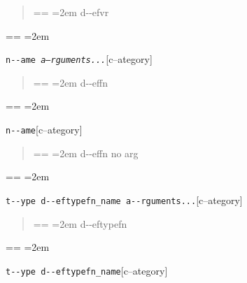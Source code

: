 \documentclass{book}
\makeatletter
\newenvironment{GNUTexinfopreformatted}{%
  \par\obeylines\obeyspaces\frenchspacing
  \parskip=\z@\parindent=\z@}{}
\makeatother
\begin{document}
%
\begin{quote}
\unskip{\parskip=0pt\noindent}%
\begin{GNUTexinfopreformatted}
\leftskip=2em\relax\ttfamily%
d{-}{-}efvr
\end{GNUTexinfopreformatted}
\end{quote}
\begin{GNUTexinfopreformatted}
\leftskip=2em\relax\ttfamily%

\end{GNUTexinfopreformatted}
\noindent\texttt{n{-}{-}ame \EmbracOn{}\textnormal{\textsl{a--rguments...}}\EmbracOff{}}\hfill[c--ategory]

%
\begin{quote}
\unskip{\parskip=0pt\noindent}%
\begin{GNUTexinfopreformatted}
\leftskip=2em\relax\ttfamily%
d{-}{-}effn
\end{GNUTexinfopreformatted}
\end{quote}
\begin{GNUTexinfopreformatted}
\leftskip=2em\relax\ttfamily%

\end{GNUTexinfopreformatted}
\noindent\texttt{n{-}{-}ame}\hfill[c--ategory]

%
\begin{quote}
\unskip{\parskip=0pt\noindent}%
\begin{GNUTexinfopreformatted}
\leftskip=2em\relax\ttfamily%
d{-}{-}effn no arg
\end{GNUTexinfopreformatted}
\end{quote}
\begin{GNUTexinfopreformatted}
\leftskip=2em\relax\ttfamily%

\end{GNUTexinfopreformatted}
\noindent\texttt{t{-}{-}ype d{-}{-}eftypefn\_name a{-}{-}rguments...}\hfill[c--ategory]

%
\begin{quote}
\unskip{\parskip=0pt\noindent}%
\begin{GNUTexinfopreformatted}
\leftskip=2em\relax\ttfamily%
d{-}{-}eftypefn
\end{GNUTexinfopreformatted}
\end{quote}
\begin{GNUTexinfopreformatted}
\leftskip=2em\relax\ttfamily%

\end{GNUTexinfopreformatted}
\noindent\texttt{t{-}{-}ype d{-}{-}eftypefn\_name}\hfill[c--ategory]
\end{document}
